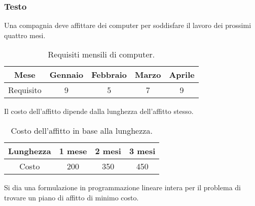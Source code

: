\subsubsection{Testo}
Una compagnia deve affittare dei computer per soddisfare il lavoro dei prossimi quattro mesi.

\begin{table}[h!]
\centering
\begin{tabular}{|c|c|c|c|c|}
\hline
Mese & Gennaio & Febbraio & Marzo & Aprile \\
\hline
Requisito & 9 & 5 & 7 & 9 \\
\hline
\end{tabular}
\caption{Requisiti mensili di computer.}
\end{table}

Il costo dell'affitto dipende dalla lunghezza dell'affitto stesso.

\begin{table}[h!]
\centering
\begin{tabular}{|c|c|c|c|}
\hline
Lunghezza & 1 mese & 2 mesi & 3 mesi \\
\hline
Costo & 200 & 350 & 450 \\
\hline
\end{tabular}
\caption{Costo dell'affitto in base alla lunghezza.}
\end{table}

Si dia una formulazione in programmazione lineare intera per il problema di trovare un piano di affitto di minimo costo.
